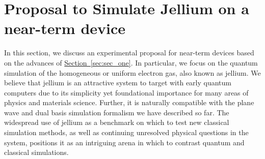 \documentclass[superscriptaddress,aps,pra,nofootinbib,notitlepage,10pt,longbibliography]{revtex4-1}
\renewcommand{\sec}[1]{\hyperref[sec:#1]{Section~\ref*{sec:#1}}}
\begin{document}
\section{Proposal to Simulate Jellium on a near-term device}
\label{sec:sec_three}

In this section, we discuss an experimental proposal for near-term devices based on the advances of \sec{sec_one}. In particular, we focus on the quantum simulation of the homogeneous or uniform electron gas, also known as jellium. We believe that jellium is an attractive system to target with early quantum computers due to its simplicity yet foundational
importance for many areas of physics and materials science. Further, it is naturally compatible with the plane wave and dual basis simulation formalism we have described so far. The widespread use of jellium as a benchmark on which to test new classical simulation methods, as well as continuing unresolved physical questions in the system, positions it as an intriguing arena in which to
contrast quantum and classical simulations.
\end{document}
